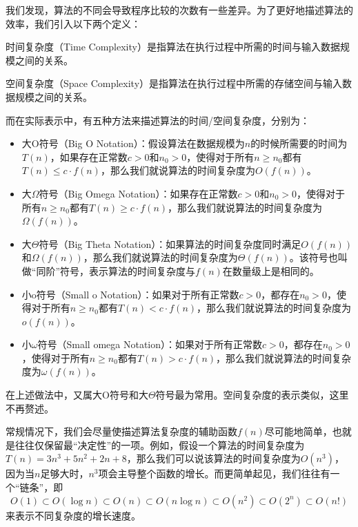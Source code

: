我们发现，算法的不同会导致程序比较的次数有一些差异。为了更好地描述算法的效率，我们引入以下两个定义：

\begin{definition}[时间复杂度]
    时间复杂度（Time Complexity）是指算法在执行过程中所需的时间与输入数据规模之间的关系。
\end{definition}

\begin{definition}[空间复杂度]
    空间复杂度（Space Complexity）是指算法在执行过程中所需的存储空间与输入数据规模之间的关系。
\end{definition}

而在实际表示中，有五种方法来描述算法的时间/空间复杂度，分别为：
\begin{itemize}
    \item 大O符号（Big O Notation）：假设算法在数据规模为$n$的时候所需要的时间为$T(n)$，如果存在正常数$c>0$和$n_0>0$，使得对于所有$n \geqslant n_0$都有$T(n) \leqslant c \cdot f(n)$，那么我们就说算法的时间复杂度为$O(f(n))$。
    \item 大$\Omega$符号（Big Omega Notation）：如果存在正常数$c>0$和$n_0>0$，使得对于所有$n \geqslant n_0$都有$T(n) \geqslant c \cdot f(n)$，那么我们就说算法的时间复杂度为$\Omega(f(n))$。
    \item 大$\Theta$符号（Big Theta Notation）：如果算法的时间复杂度同时满足$O(f(n))$和$\Omega(f(n))$，那么我们就说算法的时间复杂度为$\Theta(f(n))$。该符号也叫做“同阶”符号，表示算法的时间复杂度与$f(n)$在数量级上是相同的。
    \item 小o符号（Small o Notation）：如果对于所有正常数$c>0$，都存在$n_0>0$，使得对于所有$n \geqslant n_0$都有$T(n) < c \cdot f(n)$，那么我们就说算法的时间复杂度为$o(f(n))$。
    \item 小$\omega$符号（Small omega Notation）：如果对于所有正常数$c>0$，都存在$n_0>0$，使得对于所有$n \geqslant n_0$都有$T(n) > c \cdot f(n)$，那么我们就说算法的时间复杂度为$\omega(f(n))$。
\end{itemize}
在上述做法中，又属大O符号和大$\Theta$符号最为常用。空间复杂度的表示类似，这里不再赘述。

常规情况下，我们会尽量使描述算法复杂度的辅助函数$f(n)$尽可能地简单，也就是往往仅保留最“决定性”的一项。例如，假设一个算法的时间复杂度为$T(n) = 3n^3 + 5n^2 + 2n + 8$，那么我们可以说该算法的时间复杂度为$O(n^3)$，因为当$n$足够大时，$n^3$项会主导整个函数的增长。而更简单起见，我们往往有一个“链条”，即
\[O(1) \subset O(\log n) \subset O(n) \subset O(n \log n) \subset O(n^2) \subset O(2^n) \subset O(n!)\]
来表示不同复杂度的增长速度。

